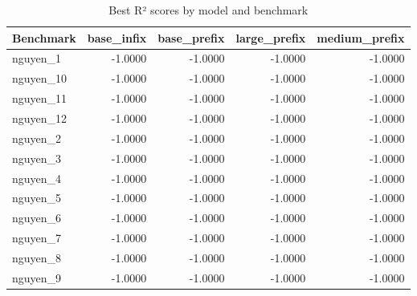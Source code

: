 \begin{table}[htbp]
\centering
\caption{Best R² scores by model and benchmark}
\label{tab:results}
\begin{tabular}{lrrrr}
\toprule
Benchmark & base_infix & base_prefix & large_prefix & medium_prefix \\
\midrule
nguyen\_1 & -1.0000 & -1.0000 & -1.0000 & -1.0000 \\
nguyen\_10 & -1.0000 & -1.0000 & -1.0000 & -1.0000 \\
nguyen\_11 & -1.0000 & -1.0000 & -1.0000 & -1.0000 \\
nguyen\_12 & -1.0000 & -1.0000 & -1.0000 & -1.0000 \\
nguyen\_2 & -1.0000 & -1.0000 & -1.0000 & -1.0000 \\
nguyen\_3 & -1.0000 & -1.0000 & -1.0000 & -1.0000 \\
nguyen\_4 & -1.0000 & -1.0000 & -1.0000 & -1.0000 \\
nguyen\_5 & -1.0000 & -1.0000 & -1.0000 & -1.0000 \\
nguyen\_6 & -1.0000 & -1.0000 & -1.0000 & -1.0000 \\
nguyen\_7 & -1.0000 & -1.0000 & -1.0000 & -1.0000 \\
nguyen\_8 & -1.0000 & -1.0000 & -1.0000 & -1.0000 \\
nguyen\_9 & -1.0000 & -1.0000 & -1.0000 & -1.0000 \\
\bottomrule
\end{tabular}
\end{table}